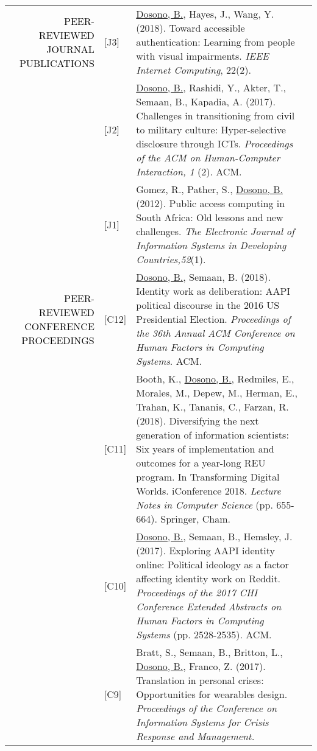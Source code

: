 \documentclass[12pt]{article}
\begin{document}
{{\begin{longtable}{Rp{1.0in}p{0.25in}p{4.75in}}
\textcolor{black}{\footnotesize{\uppercase{Peer-reviewed Journal Publications}}} & \footnotesize{[J3]} & \href{https://doi.org/10.1109/MIC.2018.112101619}{{Dosono, B.}}, Hayes, J., Wang, Y. (2018). Toward accessible authentication: Learning from people with visual impairments. \textit{IEEE Internet Computing}, 22(2). \\

& \footnotesize{[J2]} & \href{https://dl.acm.org/authorize?N42807}{{Dosono, B.}}, Rashidi, Y., Akter, T., Semaan, B., Kapadia, A. (2017). Challenges in transitioning from civil to military culture: Hyper-selective disclosure through ICTs. \textit{Proceedings of the ACM on Human-Computer Interaction, 1 }(2). ACM. \\

& \footnotesize{[J1]} & Gomez, R., Pather, S., \href{https://doi.org/10.1002/j.1681-4835.2012.tb00366.x}{{Dosono, B.}} (2012). Public access computing in South Africa: Old lessons and new challenges. \textit{The Electronic Journal of Information Systems in Developing Countries,52}(1). \\

\textcolor{black}{\footnotesize{\uppercase{Peer-reviewed Conference Proceedings}}} & 
\footnotesize{[C12]} & \href{https://dl.acm.org/authorize?N658208}{{Dosono, B.}}, Semaan, B. (2018). Identity work as deliberation: AAPI political discourse in the 2016 US Presidential Election. \textit{Proceedings of the 36th Annual ACM Conference on Human Factors in Computing Systems}. ACM. \\

& \footnotesize{[C11]} & Booth, K., \href{https://doi.org/10.1007/978-3-319-78105-1_75}{ {Dosono, B.}}, Redmiles, E., Morales, M., Depew, M., Herman, E., Trahan, K., Tananis, C., Farzan, R. (2018). Diversifying the next generation of information scientists: Six years of implementation and outcomes for a year-long REU program. In Transforming Digital Worlds. iConference 2018. \textit{Lecture Notes in Computer Science} (pp. 655-664). Springer, Cham. \\

& \footnotesize{[C10]} & \href{http://dl.acm.org/authorize?N41342}{{Dosono, B.}}, Semaan, B., Hemsley, J. (2017). Exploring AAPI identity online: Political ideology as a factor affecting identity work on Reddit. \textit{Proceedings of the 2017 CHI Conference Extended Abstracts on Human Factors in Computing Systems }(pp. 2528-2535). ACM. \\

& \footnotesize{[C9]} & Bratt, S., Semaan, B., Britton, L., \href{http://idl.iscram.org/files/sarahbratt/2017/1463\_SarahBratt\_etal2017.pdf}{{Dosono, B.}}, Franco, Z. (2017). Translation in personal crises: Opportunities for wearables design. \textit{Proceedings of the Conference on Information Systems for Crisis Response and Management.} \\


\end{longtable}}}
\end{document}
